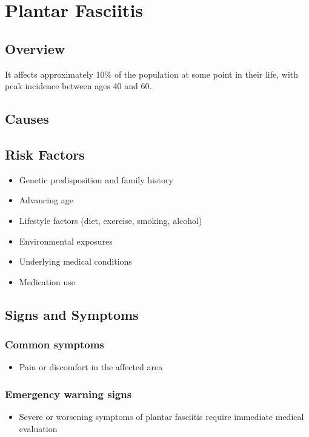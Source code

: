 \chapter{Plantar Fasciitis}
\label{sec:Plantar Fasciitis}

\section{Overview}
It affects approximately 10\% of the population at some point in their life, with peak incidence between ages 40 and 60.
\section{Causes}
\section{Risk Factors}

\begin{itemize}[noitemsep]
  \item Genetic predisposition and family history
  \item Advancing age
  \item Lifestyle factors (diet, exercise, smoking, alcohol)
  \item Environmental exposures
  \item Underlying medical conditions
  \item Medication use
\end{itemize}
\section{Signs and Symptoms}

\subsection{Common symptoms}
\begin{itemize}[noitemsep]
  \item Pain or discomfort in the affected area
  \end{itemize}

\subsection{Emergency warning signs}
\begin{itemize}[noitemsep]
  \item Severe or worsening symptoms of plantar fasciitis require immediate medical evaluation
\end{itemize}
